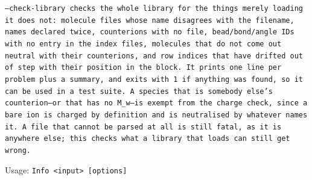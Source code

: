 \tt{--check-library} checks the whole library for the things merely loading it
does not: molecule files whose \tt{name} disagrees with the filename, names
declared twice, counterions with no file, bead/bond/angle IDs with no entry in
the index files, molecules that do not come out neutral with their
counterions, and row indices that have drifted out of step with their position
in the block. It prints one line per problem plus a summary, and exits with 1
if anything was found, so it can be used in a test suite. A species that is
somebody else's counterion---or that has no \tt{M_w}---is exempt from the
charge check, since a bare ion is charged by definition and is neutralised by
whatever names it. A file that cannot be parsed at all is still fatal, as it
is anywhere else; this checks what a library that loads can still get wrong.



\vspace{1em}
\noindent
Usage: \tt{Info <input> [options]}


